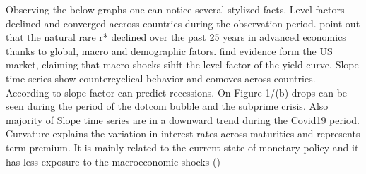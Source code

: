 \documentclass[12pt,bibliography=totoc]{article}
\begin{document}
Observing the below graphs one can notice several stylized facts. 
Level factors declined and converged accross countries during the observation period. 
\cite{holston2017measuring} point out that the natural rare r* declined over the past 25 years in advanced economics thanks to global, macro and demographic fators. 
\cite{evans2007economic} find evidence form the US market, claiming that macro shocks sihft the level factor of the yield curve.
Slope time series show countercyclical behavior and comoves across countries.
According to \cite{estrella1991term} slope factor can predict recessions.
On Figure 1/(b) drops can be seen during the period of the dotcom bubble and the subprime crisis. 
Also majority of Slope time series are in a downward trend during the Covid19 period.
Curvature explains the variation in interest rates across maturities and represents term premium. 
It is mainly related to the current state of monetary policy and it has less exposure to the macroeconomic shocks (\cite{dewachter2006macro})
\end{document}

